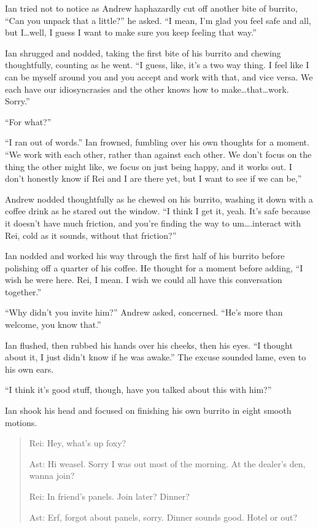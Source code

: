 Ian tried not to notice as Andrew haphazardly cut off another bite of burrito, ``Can you unpack that a little?'' he asked. ``I mean, I'm glad you feel safe and all, but I\ldots{}well, I guess I want to make sure you keep feeling that way.''

Ian shrugged and nodded, taking the first bite of his burrito and chewing thoughtfully, counting as he went. ``I guess, like, it's a two way thing. I feel like I can be myself around you and you accept and work with that, and vice versa. We each have our idiosyncrasies and the other knows how to make\ldots{}that\ldots{}work. Sorry.''

``For what?''

``I ran out of words.'' Ian frowned, fumbling over his own thoughts for a moment. ``We work with each other, rather than against each other. We don't focus on the thing the other might like, we focus on just being happy, and it works out. I don't honestly know if Rei and I are there yet, but I want to see if we can be,''

Andrew nodded thoughtfully as he chewed on his burrito, washing it down with a coffee drink as he stared out the window. ``I think I get it, yeah. It's safe because it doesn't have much friction, and you're finding the way to um\ldots{}.interact with Rei, cold as it sounds, without that friction?''

Ian nodded and worked his way through the first half of his burrito before polishing off a quarter of his coffee. He thought for a moment before adding, ``I wish he were here. Rei, I mean. I wish we could all have this conversation together.''

``Why didn't you invite him?'' Andrew asked, concerned. ``He's more than welcome, you know that.''

Ian flushed, then rubbed his hands over his cheeks, then his eyes. ``I thought about it, I just didn't know if he was awake.'' The excuse sounded lame, even to his own ears.

``I think it's good stuff, though, have you talked about this with him?''

Ian shook his head and focused on finishing his own burrito in eight smooth motions.

\secdiv

\begin{quotation}
  Rei: Hey, what's up foxy?

  Ast: Hi weasel. Sorry I was out most of the morning. At the dealer's den, wanna join?

  Rei: In friend's panels. Join later? Dinner?

  Ast: Erf, forgot about panels, sorry. Dinner sounds good. Hotel or out?
\end{quotation}

